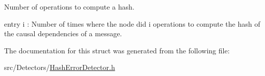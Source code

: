 Number of operations to compute a hash. 

entry i \+: Number of times where the node did i operations to compute the hash of the causal dependencies of a message. 

The documentation for this struct was generated from the following file\+:\begin{DoxyCompactItemize}
\item 
src/\+Detectors/\hyperlink{_hash_error_detector_8h}{Hash\+Error\+Detector.\+h}\end{DoxyCompactItemize}
